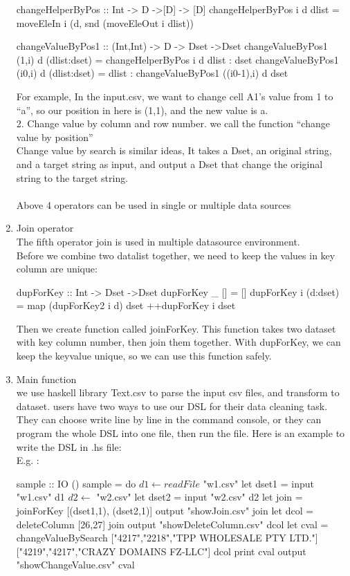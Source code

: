 \documentclass[11pt]{article}
\begin{document}
\begin{enumerate}[(1)]
\begin{program}
changeHelperByPos :: Int -> D ->[D] -> [D] 
changeHelperByPos i d dlist = moveEleIn i (d, snd (moveEleOut i dlist))

changeValueByPos1 :: (Int,Int) -> D -> Dset ->Dset
changeValueByPos1 (1,i) d (dlist:dset)  = changeHelperByPos i d dlist : dset
changeValueByPos1 (i0,i) d (dlist:dset) = dlist : changeValueByPos1 ((i0-1),i) d dset

\end{program}
 For example, In the input.csv, we want to change cell A1’s value from 1 to “a”, so our position in here is (1,1), and the new value is a.\\ 



2. Change value by column and row number. we call the function “change value by position”\\
 Change value by search is similar ideas, It takes a Dset, an original string, and a target string as input, and output a Dset that change the original string to the target string.\\
\\
Above 4 operators can be used in single or multiple data sources\\
\item Join operator\\
The fifth operator join is used in multiple datasource environment.\\
Before we combine two datalist together, we need to keep the values in key column are unique:\\
\begin{program}
dupForKey :: Int -> Dset ->Dset
dupForKey _ []       = []
dupForKey i (d:dset) = map (dupForKey2 i d) dset ++dupForKey i dset
\end{program}
Then we create function called joinForKey. This function takes two dataset with key column number, then join them together. With dupForKey, we can keep the keyvalue unique, so we can use this function safely.

\item Main function\\
we use haskell library Text.csv to parse the input csv files, and transform to dataset. 
users have two ways to use our DSL for their data cleaning task. They can choose write line by line in the command console, or they can program the whole DSL into one file, then run the file. Here is an example to write the DSL in .hs file:\\
E.g. : \\
\begin{program}
sample :: IO ()
sample = do
 	$d1 \xleftarrow{}  readFile$ "w1.csv"
 	let dset1 = input "w1.csv" d1
 	$ d2 \xleftarrow{}  $  "w2.csv"
 	let dset2 = input "w2.csv" d2
        let join = joinForKey [(dset1,1), (dset2,1)]
 	output "showJoin.csv" join
 	let dcol = deleteColumn [26,27] join
 	output "showDeleteColumn.csv" dcol
 	let cval = changeValueBySearch ["4217","2218","TPP WHOLESALE PTY LTD."] ["4219","4217","CRAZY DOMAINS FZ-LLC"] dcol
	 print cval
 	output "showChangeValue.csv" cval
\end{program}






\end{enumerate}
\end{document}

